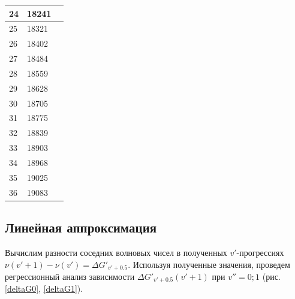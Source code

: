 \begin{longtable}[h!]{|p{1cm}|p{3cm}|p{3cm}|}
	\hline
	24 & 18241 &  \bigstrut\\
	\hline
	25 & 18321 &  \bigstrut\\
	\hline
	26 & 18402 &  \bigstrut\\
	\hline
	27 & 18484 &  \bigstrut\\
	\hline
	28 & 18559 &  \bigstrut\\
	\hline
	29 & 18628 &  \bigstrut\\
	\hline
	30 & 18705 &  \bigstrut\\
	\hline
	31 & 18775 &  \bigstrut\\
	\hline
	32 & 18839 &  \bigstrut\\
	\hline
	33 & 18903 &  \bigstrut\\
	\hline
	34 & 18968 &  \bigstrut\\
	\hline
	35 & 19025 &  \bigstrut\\
	\hline
	36 & 19083 &  \bigstrut\\
	\hline
\end{longtable}
\subsection{Линейная аппроксимация}
Вычислим разности соседних волновых чисел в полученных $v'$-прогрессиях \\$\nu(v'+1)-\nu(v')= \Delta G'_{v'+0.5}$. Используя полученные значения, проведем регрессионный анализ зависимости $\Delta G'_{v'+0.5}(v'+1)$ при $v'' = 0; 1$ (рис. \ref{deltaG0}, \ref{deltaG1}).

